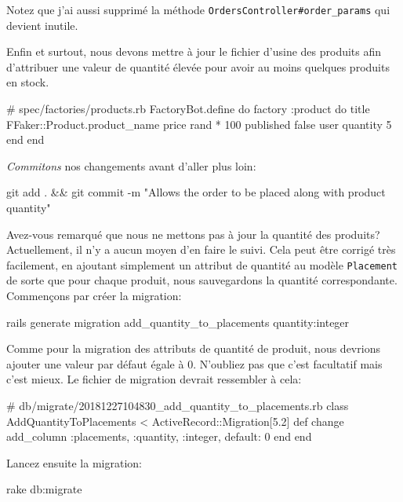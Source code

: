 \documentclass[]{report}
\begin{document}
    Notez que j'ai aussi supprimé la méthode \verb|OrdersController#order_params| qui devient inutile.

    Enfin et surtout, nous devons mettre à jour le fichier d'usine des produits afin d'attribuer une valeur de quantité élevée pour avoir au moins quelques produits en stock.

    \begin{rubycode}
    # spec/factories/products.rb
    FactoryBot.define do
      factory :product do
        title { FFaker::Product.product_name }
        price { rand * 100 }
        published { false }
        user
        quantity { 5 }
      end
    end
    \end{rubycode}

    \textit{Commitons} nos changements avant d'aller plus loin:

    \begin{bashcode}
    git add . && git commit -m "Allows the order to be placed along with product quantity"
    \end{bashcode}

    Avez-vous remarqué que nous ne mettons pas à jour la quantité des produits? Actuellement, il n'y a aucun moyen d'en faire le suivi. Cela peut être corrigé très facilement, en ajoutant simplement un attribut de quantité au modèle \verb|Placement| de sorte que pour chaque produit, nous sauvegardons la quantité correspondante. Commençons par créer la migration:

    \begin{bashcode}
    rails generate migration add_quantity_to_placements quantity:integer
    \end{bashcode}

    Comme pour la migration des attributs de quantité de produit, nous devrions ajouter une valeur par défaut égale à 0. N'oubliez pas que c'est facultatif mais c'est mieux. Le fichier de migration devrait ressembler à cela:

    \begin{rubycode}
    # db/migrate/20181227104830_add_quantity_to_placements.rb
    class AddQuantityToPlacements < ActiveRecord::Migration[5.2]
      def change
        add_column :placements, :quantity, :integer, default: 0
      end
    end
    \end{rubycode}

    Lancez ensuite la migration:

    \begin{bashcode}
    rake db:migrate
    \end{bashcode}
\end{document}
